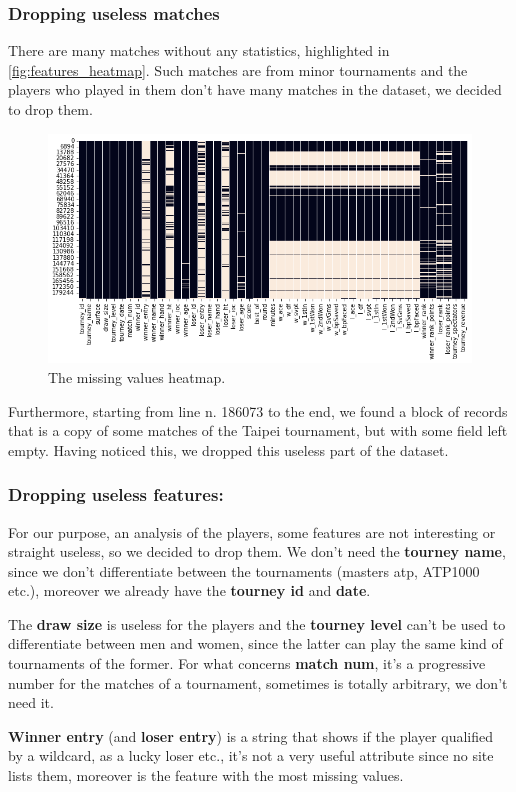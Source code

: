 \subsubsection{Dropping useless matches}
There are many matches without any statistics, highlighted in \autoref{fig:features_heatmap}. Such matches are from minor tournaments and the players who played in them don't have many matches in the dataset, we decided to drop them.
\begin{figure}[H]
    \centering
    \includegraphics[width= 0.6\linewidth]{images/data_understanding/feature_heatmap.png}
    \caption{The missing values heatmap.}
    \label{fig:features_heatmap}
\end{figure}
Furthermore, starting from line n. 186073 to the end, we found a block of records that is a copy of some matches of the Taipei tournament, but with some field left empty. Having noticed this, we dropped this useless part of the dataset.

\subsubsection{Dropping useless features:}
For our purpose, an analysis of the players, some features are not interesting or straight useless, so we decided to drop them. We don't need the \textbf{tourney name}, since we don't differentiate between the tournaments (masters atp, ATP1000 etc.), moreover we already have the \textbf{tourney id} and \textbf{date}.

The \textbf{draw size} is useless for the players and the \textbf{tourney level} can't be used to differentiate between men and women, since the latter can play the same kind of tournaments of the former. For what concerns \textbf{match num}, it's a progressive number for the matches of a tournament, sometimes is totally arbitrary, we don't need it.

\textbf{Winner entry} (and \textbf{loser entry}) is a string that shows if the player qualified by a wildcard, as a lucky loser etc., it's not a very useful attribute since no site lists them, moreover is the feature with the most missing values.

